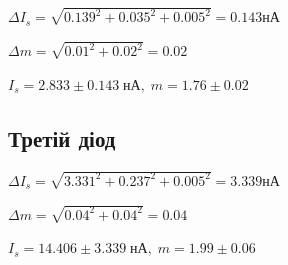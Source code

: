 \documentclass[12pt]{article}
\begin{document}
$\Delta I_s = \sqrt{0.139^2 + 0.035^2 + 0.005^{2}} = 0.143$нА

$\Delta m = \sqrt{0.01^{2} + 0.02^{2}} = 0.02$

$I_s = 2.833 \pm 0.143 \; \text{нА}, \; m = 1.76 \pm 0.02$


\subsection{Третій діод}

$\Delta I_s = \sqrt{3.331^2 + 0.237^2 + 0.005^{2}} = 3.339$нА

$\Delta m = \sqrt{0.04^{2} + 0.04^{2}} = 0.04$

$I_s = 14.406 \pm 3.339 \; \text{нА}, \; m = 1.99 \pm 0.06$


\newpage


\newpage
\end{document}
